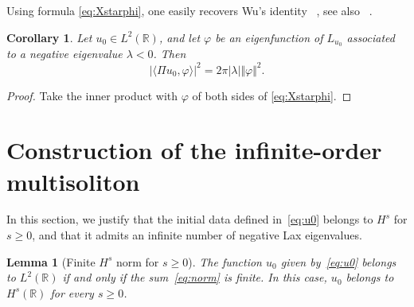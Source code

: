 \documentclass[english, 12pt]{amsart}%
\newcommand{\R}{\mathbb{R}}
\renewcommand{\Im}{\mathrm{Im}}
\newtheorem{lemma}[definition]{Lemma}
\newtheorem{corollary}[definition]{Corollary}
\numberwithin{equation}{section}
\begin{document}
Using formula \eqref{eq:Xstarphi}, one easily recovers Wu's identity ~\cite[Lemma 2.5]{Wu16a}, see also ~\cite{BadreddineKV25}. 
\begin{corollary}\label{cor:Wu}
Let $u_0\in L^2(\R)$, and let $\varphi$ be an eigenfunction of $L_{u_0}$ associated to a negative eigenvalue $\lambda<0$. Then
\[ |\langle \Pi u_0,\varphi \rangle |^2=2\pi |\lambda |\Vert \varphi \Vert ^2.\]
\end{corollary}
\begin{proof}
Take the inner product with $\varphi $ of both sides of \eqref{eq:Xstarphi}.
\end{proof}


\section{Construction of the infinite-order multisoliton}\label{sec:construction}

In this section, we justify that the initial data defined in~\eqref{eq:u0} belongs to $H^s$ for $s\geq 0$, and that it admits an infinite number of negative Lax eigenvalues.

\begin{lemma}[Finite $H^s$ norm for $s\geq 0$]\label{lem:L2}
The function $u_0$ given by~\eqref{eq:u0} belongs to $L^2(\R)$ if and only if the sum~\eqref{eq:norm} is finite.
In this case,  $u_0$ belongs to  $H^s(\R)$ for every $s\geq 0$.
\end{lemma}
\end{document}
